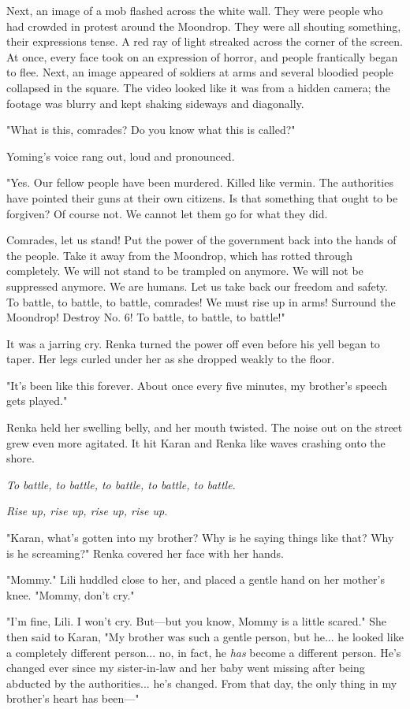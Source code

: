 Next, an image of a mob flashed across the white wall. They were people
who had crowded in protest around the Moondrop. They were all shouting
something, their expressions tense. A red ray of light streaked across
the corner of the screen. At once, every face took on an expression of
horror, and people frantically began to flee. Next, an image appeared of
soldiers at arms and several bloodied people collapsed in the square.
The video looked like it was from a hidden camera; the footage was
blurry and kept shaking sideways and diagonally.

"What is this, comrades? Do you know what this is called?"

Yoming's voice rang out, loud and pronounced.

"Yes. Our fellow people have been murdered. Killed like vermin. The
authorities have pointed their guns at their own citizens. Is that
something that ought to be forgiven? Of course not. We cannot let them
go for what they did.

Comrades, let us stand! Put the power of the government back into the
hands of the people. Take it away from the Moondrop, which has rotted
through completely. We will not stand to be trampled on anymore. We will
not be suppressed anymore. We are humans. Let us take back our freedom
and safety. To battle, to battle, to battle, comrades! We must rise up
in arms! Surround the Moondrop! Destroy No. 6! To battle, to battle, to
battle!"

It was a jarring cry. Renka turned the power off even before his yell
began to taper. Her legs curled under her as she dropped weakly to the
floor.

"It's been like this forever. About once every five minutes, my
brother's speech gets played."

Renka held her swelling belly, and her mouth twisted. The noise out on
the street grew even more agitated. It hit Karan and Renka like waves
crashing onto the shore.

\emph{To battle, to battle, to battle, to battle, to battle.}

\emph{Rise up, rise up, rise up, rise up.}

"Karan, what's gotten into my brother? Why is he saying things like
that? Why is he screaming?" Renka covered her face with her hands.

"Mommy." Lili huddled close to her, and placed a gentle hand on her
mother's knee. "Mommy, don't cry."

"I'm fine, Lili. I won't cry. But---but you know, Mommy is a little
scared." She then said to Karan, "My brother was such a gentle person,
but he... he looked like a completely different person... no, in fact,
he \emph{has} become a different person. He's changed ever since my
sister-in-law and her baby went missing after being abducted by the
authorities... he's changed. From that day, the only thing in my
brother's heart has been---"

